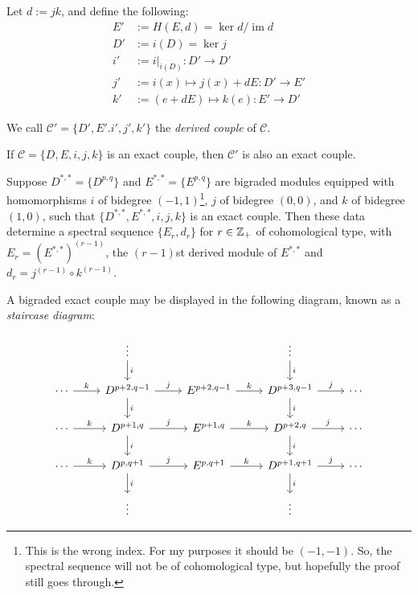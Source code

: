 \documentclass{MetricNotes2023}
\def\inte{\ensuremath\mathbb{Z}}
\DeclareMathOperator{\im}{im}
\begin{document}
Let \(d:=jk\), and define the following:
\begin{align*}
E'&:=H(E, d)=\ker d/\im d\\
D'&:=i(D)=\ker j\\
i'&:=i|_{i(D)} : D'\to D'\\
j'&:=i(x)\mapsto j(x)+dE : D'\to E'\\
k'&:=(e+dE)\mapsto k(e) : E' \to D'
\end{align*}

We call \(\mathcal{C}'=\{D', E'. i', j', k'\}\) the \textit{derived couple} of \(\mathcal{C}\). 

\begin{proposition}
If \(\mathcal{C}=\{D, E, i, j, k\}\) is an exact couple, then \(\mathcal{C}'\) is also an exact couple.
\end{proposition}

\begin{theorem}\label{2503301131}
Suppose \(D^{*,*}=\{D^{p,q}\}\) and \(E^{*,*}=\{E^{p,q}\}\) are bigraded modules equipped with homomorphisms \(i\) of bidegree \((-1,1)\)\footnote{This is the wrong index. For my purposes it should be \((-1, -1)\). So, the spectral sequence will not be of cohomological type, but hopefully the proof still goes through.}, \(j\) of bidegree \((0,0)\), and \(k\) of bidegree \((1,0)\), such that \(\{D^{*,*}, E^{*,*}, i, j, k\}\) is an exact couple. Then these data determine a spectral sequence \(\{E_r, d_r\}\) for \(r\in \inte_+\) of cohomological type, with \(E_r=(E^{*,*})^{(r-1)}\), the \((r-1)\)st derived module of \(E^{*,*}\) and \(d_r=j^{(r-1)}\circ k^{(r-1)}\).
\end{theorem}

A bigraded exact couple may be displayed in the following diagram, known as a \textit{staircase diagram}:

\[\begin{tikzcd} 
   &  \vdots \arrow[d, "i"] &  & \vdots \arrow[d, "i"] & \\
 \cdots \arrow[r, "k"] & D^{p+2, q-1} \arrow[d, "i"] \arrow[r, "j"] & E^{p+2,q-1}  \arrow[r, "k"] & D^{p+3,q-1} \arrow[d, "i"] \arrow[r, "j"] & \cdots \\
 \cdots \arrow[r, "k"] & D^{p+1,q} \arrow[d, "i"] \arrow[r, "j"] & E^{p+1,q}  \arrow[r, "k"] & D^{p+2,q} \arrow[d, "i"] \arrow[r, "j"] & \cdots \\
 \cdots \arrow[r, "k"] & D^{p,q+1}  \arrow[d, "i"] \arrow[r, "j"] & E^{p,q+1}  \arrow[r, "k"] & D^{p+1,q+1} \arrow[d, "i"] \arrow[r, "j"] & \cdots \\
 & \vdots &  & \vdots & 
\end{tikzcd}\]
\end{document}
